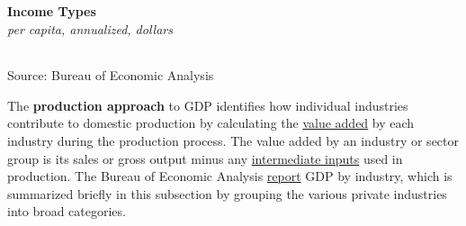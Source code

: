 \documentclass{report}
\begin{document}
\begin{minipage}{0.76\textwidth}

\normalsize \textbf{Income Types}\\
\footnotesize{\textit{per capita, annualized, dollars}}\\
\hspace{-2mm}  \setlength{\tabcolsep}{3.7pt} \color{black!90}
		{\renewcommand{\arraystretch}{1.6}
		 \begin{tabular}{p{54mm} R{13mm} R{13mm} R{13mm} R{13mm}}
			 \hline
		\end{tabular}}
\vspace{-2mm}

\footnotesize{Source: Bureau of Economic Analysis}
\end{minipage}
\newpage
\begin{minipage}{0.76\textwidth}
\small The \textbf{production approach} to GDP identifies how individual industries contribute to domestic production by calculating the \href{https://www.bea.gov/help/glossary/value-added}{value added} by each industry during the production process. The value added by an industry or sector group is its sales or gross output minus any \href{https://www.bea.gov/help/glossary/intermediate-inputs}{intermediate inputs} used in production. The Bureau of Economic Analysis \href{https://www.bea.gov/data/gdp/gdp-industry}{report} GDP by industry, which is summarized briefly in this subsection by grouping the various private industries into broad categories. 


\end{minipage}
\vspace{1mm}
\end{document}
